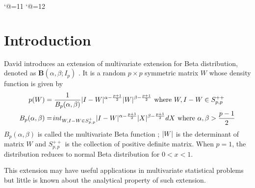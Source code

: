 \documentclass[twoside]{article}%
\DeclarePairedDelimiter\abs{\lvert}{\rvert}
\begin{document}
\newtheorem{theorem}{Theorem}[section]                                               %
\newtheorem{definition}{Definition}[section]                                         %
\newtheorem{lemma}{Lemma}[section]                                                   %
\newtheorem{proposition}{Proposition}[section]                                       %
\newtheorem{corollary}{Corollary}[section]                                           %
\newtheorem{remark}{Remark}[section]                                                 %
\renewcommand{\theequation}{\thesection.\arabic{equation}}                           %
\catcode`@=11                                                                        %
\setcounter{page}{1}                                                                 %
\thispagestyle{empty}                                                                %
\catcode`@=12                                                                        %

\section{Introduction}

David introduces an extension of
multivariate extension for Beta distribution,
denoted as $\mathbf{B}(\alpha, \beta; I_p)$ \cite{david1981} .
It is a random $p\times p$  symmetric matrix $W$ whose density
function is given by
\begin{align}
p(W) &= \frac{1}{B_p(\alpha, \beta)}\abs{I-W}^{\alpha-\frac{p+1}{2}}
\abs{W}^{\beta-\frac{p+1}{2}} \textrm{ where } W, I-W \in S_{p,p}^{++}
\label{eq:distr}\\
B_p(\alpha, \beta) &= \int_{W,I-W \in S_{p,p}^{+} }\abs{I-W}^{\alpha-\frac{p+1}{2}}
\abs{X}^{\beta-\frac{p+1}{2}}dX \textrm{ where } \alpha, \beta > \frac{p-1}{2}
\end{align}
$B_p(\alpha, \beta)$ is called the multivariate Beta function \cite{siegel_1935}; 
$\abs{W}$ is the determinant of matrix $W$ and $S_{p,p}^{++}$ is the 
collection of positive
definite matrix.
When $p=1$, the distribution reduces to normal Beta distribution for
$0<x<1$.

This extension may have useful applications in multivariate statistical
problems but little is known about the analytical property of such extension.
\end{document}
